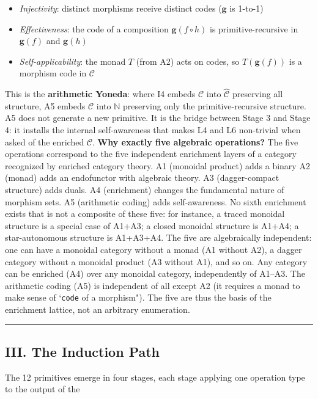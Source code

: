 \documentclass[12pt,a4paper]{article}
\makeatletter
\renewcommand{\_}{\ig@origunderscore\discretionary{}{}{}}
\makeatother
\begin{document}
\begin{itemize}
 \item \emph{Injectivity}: distinct morphisms receive distinct codes ($\mathbf{g}$ is 1-to-1)
 \item \emph{Effectiveness}: the code of a composition $\mathbf{g}(f \circ h)$ is primitive-recursive in
$\mathbf{g}(f)$ and $\mathbf{g}(h)$
 \item \emph{Self-applicability}: the monad $T$ (from A2) acts on codes, so $T(\mathbf{g}(f))$ is a morphism code in
$\mathcal{C}$
\end{itemize}

This is the \textbf{arithmetic Yoneda}: where I4 embeds $\mathcal{C}$ into $\hat{\mathcal{C}}$ preserving all
structure, A5 embeds $\mathcal{C}$ into $\mathbb{N}$ preserving only the primitive-recursive structure. A5 does not
generate a new primitive. It is the bridge between Stage 3 and Stage 4: it installs the internal self-awareness that
makes L4 and L6 non-trivial when asked of the enriched $\mathcal{C}$.
\textbf{Why exactly five algebraic operations?} The five operations correspond to the five independent enrichment
layers of a category recognized by enriched category theory. A1 (monoidal product) adds a binary
A2 (monad) adds an endofunctor with algebraic theory. A3 (dagger-compact structure) adds duals. A4
(enrichment) changes
the fundamental nature of morphism sets. A5 (arithmetic coding) adds self-awareness. No sixth enrichment exists that is
not a composite of these five: for instance, a traced monoidal structure is a special case of A1+A3; a closed monoidal
structure is A1+A4; a star-autonomous structure is A1+A3+A4. The five are algebraically independent: one can have a
monoidal category without a monad (A1 without A2), a dagger category without a monoidal product (A3 without A1), and so
on. Any category can be enriched (A4) over any monoidal category, independently of A1--A3. The arithmetic coding (A5)
is independent of all except A2 (it requires a monad to make sense of `\texttt{code} of a morphism"). The five are thus the
basis of the enrichment lattice, not an arbitrary enumeration.

\begin{center}
\rule{0.5\textwidth}{0.4pt}
\end{center}


\subsection{III. The Induction Path}
The 12 primitives emerge in four stages, each stage applying one operation type to the output of the
\end{document}
